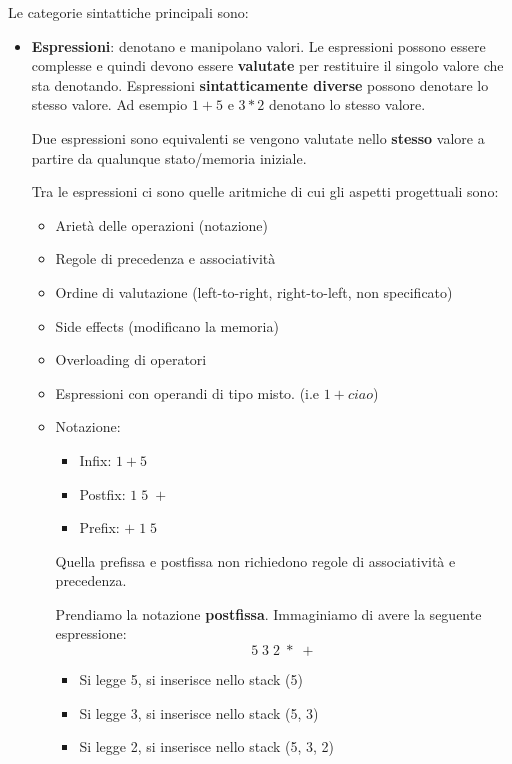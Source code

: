 \documentclass[a4paper]{article}
\begin{document}
\vspace{1em}
\noindent
Le categorie sintattiche principali sono:
\begin{itemize}
  \item \textbf{Espressioni}: denotano e manipolano valori. Le espressioni possono
    essere complesse e quindi devono essere \textbf{valutate} per restituire il
    singolo valore che sta denotando.
    Espressioni \textbf{sintatticamente diverse} possono denotare lo stesso valore.
    Ad esempio \( 1 + 5 \) e \( 3 * 2 \) denotano lo stesso valore.

    \dfn{}
    {
      Due espressioni sono equivalenti se vengono valutate nello \textbf{stesso}
      valore a partire da qualunque stato/memoria iniziale.
    }

    Tra le espressioni ci sono quelle aritmiche di cui gli aspetti progettuali sono:
    \begin{itemize}
        \item Arietà delle operazioni (notazione)
        \item Regole di precedenza e associatività
        \item Ordine di valutazione (left-to-right, right-to-left, non specificato)
        \item Side effects (modificano la memoria)
        \item Overloading di operatori
        \item Espressioni con operandi di tipo misto. (i.e $1 + ciao$)
        \item Notazione:
        \begin{itemize}
            \item Infix: \( 1 + 5 \)
            \item Postfix: \( 1 \; 5 \; + \)
            \item Prefix: \( + \; 1 \; 5 \)
        \end{itemize}
        Quella prefissa e postfissa non richiedono regole di associatività e precedenza. 
        \ex{}
        {   
            Prendiamo la notazione \textbf{postfissa}.
            Immaginiamo di avere la seguente espressione:
            \[
            5 \;  3 \; 2 \;  \ast \; +
            \]
            \begin{itemize}
                \item Si legge 5, si inserisce nello stack (5)
                \item Si legge 3, si inserisce nello stack (5, 3)
                \item Si legge 2, si inserisce nello stack (5, 3, 2)

\end{itemize}}
\end{itemize}
\end{itemize}
\end{document}
